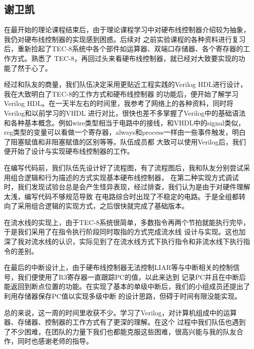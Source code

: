\subsection*{谢卫凯}

在最开始的理论课程结束后，由于理论课程学习中对硬布线控制器介绍较为抽象，我仍对硬布线控制器的实现感到困惑。后续对
之前实验课程的各种资料进行复习后，重新捡起了TEC-8系统中各个部件如运算器、双端口存储器、各个寄存器的工作方式。熟悉了
TEC-8，再回过头来看硬布线控制器，就已经对大致要实现的功能了然于心了。

经过和队友的商量，我们队伍决定采用更贴近工程实践的Verilog HDL进行设计，我在大致明白了TEC-8的工作方式和硬布线控制器
的功能后，便开始了解学习Verilog HDL。在一天半左右的时间里，我参考了网络上的各种资料，同时将Verilog和以前学习的VHDL
进行对比，很快也差不多掌握了Verilog中的基础语法和各种基本概念。例如wire类型相当于电路中的接线，和VHDL中的signal类似，
reg类型的变量可以看做一个寄存器，always和process一样由一些事件触发，明白了阻塞赋值和非阻塞赋值的区别等等。队伍成员都
大致可以使用Verilog后，我们便开始了设计与实现硬布线控制器的工作。

在编写代码前，我们队伍先设计好了流程图，有了流程图后，我和队友分别尝试采用组合逻辑和行为描述的方式实现基本硬布线控制器，
在第二种实现方式调试时，我们发现试验台总是会产生怪异表现，经过排查，我们认为是由于对硬件理解太浅，编写代码不够规范导致
在电路综合时出现了不稳定的电路。于是全组都转向了采用组合逻辑的实现方式，之后很快就完成了基础版本。

在流水线的实现上，由于TEC-8系统很简单，多数指令再两个节拍就能执行完毕，于是我们采用了在指令执行阶段同时取指的方式完成流水线
设计与实现。这也加深了我对流水线的认识，实际见到了在流水线方式下执行指令和非流水线下执行指令的差别。

在最后的中断设计上，由于硬布线控制器无法控制LIAR等与中断相关的控制信号，我们便使用了R3寄存器一直跟踪PC的值，以此来达到
记录PC并且在中断后能返回到断点位置的功能。在实现了基本的单级中断后，我们的小组成员还提出了利用存储器保存PC值以实现多级中断
的设计思路，但碍于时间有限没能实现。

总的来说，这一周的时间里收获不少。学习了Verilog，对计算机组成中的运算器、存储器、控制器的工作方式有了更深的理解。在这个
过程中我们队伍也遇到了不少困难，在团队的力量下我们也都能克服这些困难，很高兴能与我的队友合作，同时也感谢老师的指导。
